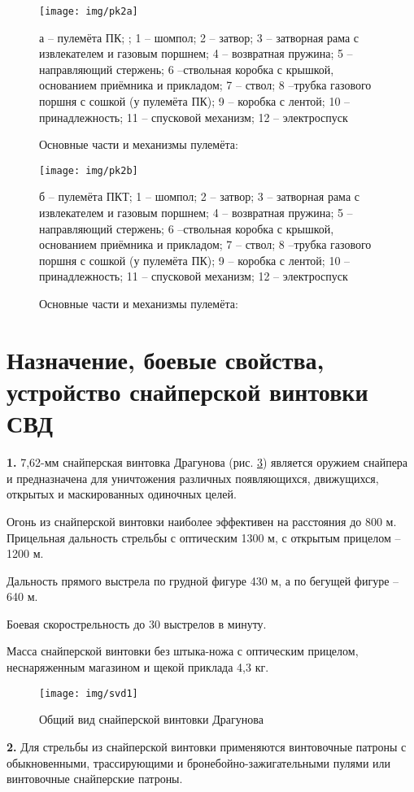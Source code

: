 \documentclass[12pt,a4paper]{report}
\begin{document}
\begin{figure}
\centering
\texttt{[image: img/pk2a]}
\caption{Основные части и механизмы пулемёта:}{а – пулемёта ПК; ; 1 – шомпол; 2 – затвор; 3 – затворная рама с извлекателем и газовым поршнем; 4 – возвратная пружина; 5 – направляющий стержень; 6 –ствольная коробка с крышкой, основанием приёмника и прикладом; 7 – ствол; 8 –трубка газового поршня с сошкой (у пулемёта ПК); 9 – коробка с лентой; 10 –принадлежность; 11 – спусковой механизм; 12 – электроспуск}
\label{fig:pk2a}
\end{figure}
\begin{figure}[h]
\centering
\texttt{[image: img/pk2b]}
\caption{Основные части и механизмы пулемёта:}{б – пулемёта ПКТ; 1 – шомпол; 2 – затвор; 3 – затворная рама с извлекателем и газовым поршнем; 4 – возвратная пружина; 5 – направляющий стержень; 6 –ствольная коробка с крышкой, основанием приёмника и прикладом; 7 – ствол; 8 –трубка газового поршня с сошкой (у пулемёта ПК); 9 – коробка с лентой; 10 –принадлежность; 11 – спусковой механизм; 12 – электроспуск}
\label{fig:pk2b}
\end{figure}


\section{Назначение, боевые свойства, устройство снайперской винтовки СВД}
\textbf{1.} 7,62-мм снайперская винтовка Драгунова (рис. \ref{fig:svd1}) является оружием снайпера и предназначена для уничтожения различных появляющихся, движущихся, открытых и маскированных одиночных целей.

Огонь из снайперской винтовки наиболее эффективен на расстояния до 800 м. Прицельная дальность стрельбы с оптическим 1300 м, с открытым прицелом – 1200 м.

Дальность прямого выстрела по грудной фигуре 430 м, а по бегущей фигуре – 640 м.

Боевая скорострельность до 30 выстрелов в минуту.

Масса снайперской винтовки без штыка-ножа с оптическим прицелом, неснаряженным магазином и щекой приклада 4,3 кг.
\begin{figure}[h!]
\centering
\texttt{[image: img/svd1]}
\caption{Общий вид снайперской винтовки Драгунова}{}
\label{fig:svd1}
\end{figure}

\textbf{2.} Для стрельбы из снайперской винтовки применяются винтовочные патроны с обыкновенными, трассирующими и бронебойно-зажигательными пулями или винтовочные снайперские патроны.
\end{document}
